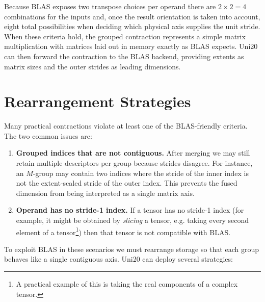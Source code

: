 \documentclass[11pt]{article}
\begin{document}
Because BLAS exposes two transpose choices per operand there are $2\times2=4$ combinations for the
inputs and, once the result orientation is taken into account, eight total possibilities when
deciding which physical axis supplies the unit stride.  When these criteria hold, the grouped
contraction represents a simple matrix multiplication with
matrices laid out in memory exactly as BLAS expects.  Uni20 can then forward the contraction to the BLAS
backend, providing extents as matrix sizes and the outer strides as leading dimensions.

\section{Rearrangement Strategies}
Many practical contractions violate at least one of the BLAS-friendly criteria.  The two common
issues are:
\begin{enumerate}
  \item \textbf{Grouped indices that are not contiguous.}  After merging we may still retain
        multiple descriptors per group because strides disagree.  For instance, an $M$-group may
        contain two indices where the stride of the inner index is not the extent-scaled stride of
        the outer index.  This prevents the fused dimension from being interpreted as a single
        matrix axis.
  \item \textbf{Operand has no stride-1 index.}  If a tensor has no stride-1 index (for example,
        it might be obtained by \emph{slicing} a tensor, e.g. taking every second element of a
        tensor\footnote{A practical example of this is taking the real components of a complex
        tensor.}) then that tensor is not compatible with BLAS.
\end{enumerate}
To exploit BLAS in these scenarios we must rearrange storage so that each group behaves like a
single contiguous axis.  Uni20 can deploy several strategies:
\end{document}
